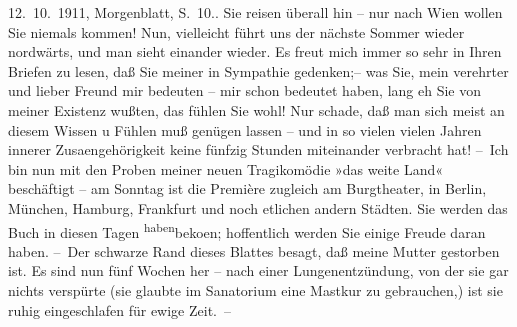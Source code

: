 \begin{ledgroupsized}[t]{13cm}
{{{                                12. 10. 1911, Morgenblatt, S. 10.}}}\label{K_L02035_1h}.\pend
           \pstart
           Sie reisen überall hin – nur nach Wien wollen Sie
                    niemals kommen! Nun, vielleicht führt uns der nächste Sommer wieder nordwärts,
                    und man sieht einander wieder. Es freut mich immer so sehr in Ihren Briefen zu
                    lesen, daß Sie meiner {\pb}in Sympathie
                    gedenken;– was Sie, mein verehrter und lieber Freund mir bedeuten – mir schon
                    bedeutet haben, lang eh Sie von meiner Existenz wußten, das fühlen Sie wohl! Nur
                    schade, daß man sich meist an diesem Wissen u Fühlen muß genügen lassen – und in
                    so vielen vielen Jahren innerer Zusa{\geminationm}engehörigkeit
                    keine fünfzig Stunden miteinander verbracht hat!\pend
           \pstart
           – Ich bin nun mit den Proben meiner {\pb}neuen
                    Tragikomödie »das weite Land« beschäftigt – am
                    Sonntag ist die Première zugleich am Burgtheater, in Berlin, München, Hamburg, Frankfurt und noch etlichen andern Städten. Sie
                    werden das Buch in diesen
                    Tagen \substVorne{}\textsuperscript{haben}\substDazwischen{}beko{\geminationm}en\substHinten{}; hoffentlich werden Sie einige Freude daran haben.\pend
           \pstart
           – Der schwarze Rand dieses Blattes besagt, daß meine Mutter gestorben ist. Es sind nun fünf
                    Wochen her – nach einer {\pb}Lungenentzündung,
                    von der sie gar nichts verspürte (sie glaubte im Sanatorium eine Mastkur zu
                    gebrauchen,) ist sie ruhig eingeschlafen für ewige Zeit. –\pend

\end{ledgroupsized}
